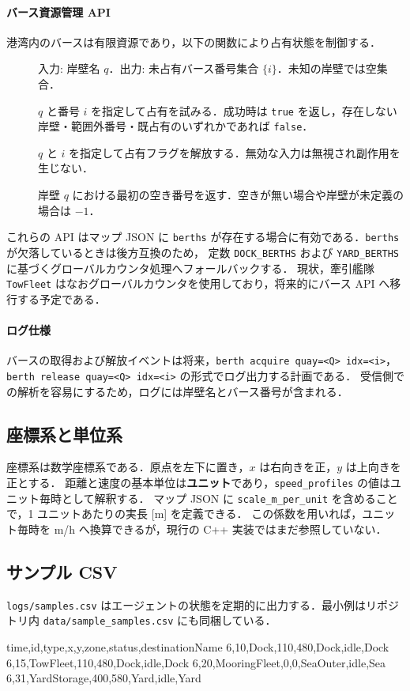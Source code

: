 \documentclass[10pt,letterpaper]{jsarticle}
\begin{document}
\paragraph{バース資源管理 API}
港湾内のバースは有限資源であり，以下の関数により占有状態を制御する．
\begin{description}
  \item[] 入力: 岸壁名 $q$．出力: 未占有バース番号集合 $\{i\}$．未知の岸壁では空集合．
  \item[] $q$ と番号 $i$ を指定して占有を試みる．成功時は \texttt{true} を返し，存在しない岸壁・範囲外番号・既占有のいずれかであれば \texttt{false}．
  \item[] $q$ と $i$ を指定して占有フラグを解放する．無効な入力は無視され副作用を生じない．
  \item[] 岸壁 $q$ における最初の空き番号を返す．空きが無い場合や岸壁が未定義の場合は $-1$．
\end{description}
これらの API はマップ JSON に \texttt{berths} が存在する場合に有効である．\texttt{berths} が欠落しているときは後方互換のため，
定数 \texttt{DOCK\_BERTHS} および \texttt{YARD\_BERTHS} に基づくグローバルカウンタ処理へフォールバックする．
現状，牽引艦隊 \texttt{TowFleet} はなおグローバルカウンタを使用しており，将来的にバース API へ移行する予定である．

\paragraph{ログ仕様}
バースの取得および解放イベントは将来，\texttt{berth acquire quay=<Q> idx=<i>}，
\texttt{berth release quay=<Q> idx=<i>} の形式でログ出力する計画である．
受信側での解析を容易にするため，ログには岸壁名とバース番号が含まれる．

\subsection{座標系と単位系}
座標系は数学座標系である．原点を左下に置き，$x$ は右向きを正，$y$ は上向きを正とする．
距離と速度の基本単位は\textbf{ユニット}であり，\texttt{speed\_profiles} の値はユニット毎時として解釈する．
マップ JSON に \texttt{scale\_m\_per\_unit} を含めることで，1 ユニットあたりの実長 [m] を定義できる．
この係数を用いれば，ユニット毎時を m/h へ換算できるが，現行の C++ 実装ではまだ参照していない．

\subsection{サンプル CSV}
\texttt{logs/samples.csv} はエージェントの状態を定期的に出力する．最小例はリポジトリ内 \texttt{data/sample\_samples.csv} にも同梱している．
\begin{cmdcode}
time,id,type,x,y,zone,status,destinationName
6,10,Dock,110,480,Dock,idle,Dock
6,15,TowFleet,110,480,Dock,idle,Dock
6,20,MooringFleet,0,0,SeaOuter,idle,Sea
6,31,YardStorage,400,580,Yard,idle,Yard
\end{cmdcode}
\end{document}
